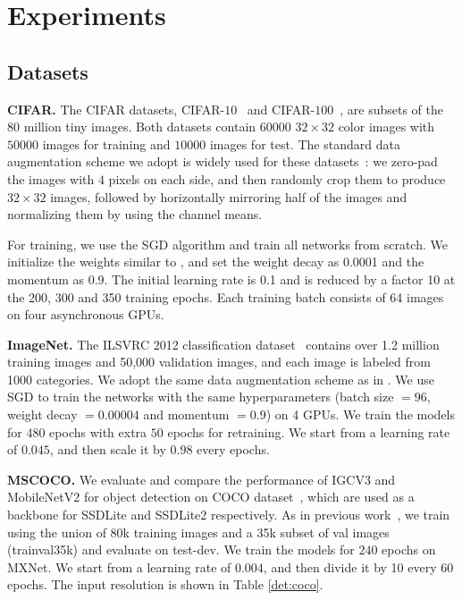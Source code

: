 \documentclass{bmvc2k}
\begin{document}
	\section{Experiments}
	\label{sec:exp}
	\subsection{Datasets}
	\noindent\textbf{CIFAR.}
	The CIFAR datasets, CIFAR-$10$~\cite{Cifar10} and CIFAR-$100$~\cite{Cifar100},
	are subsets of the $80$ million tiny images.
	Both datasets contain $60000$ $32\times32$ color images with $50000$ images for training and $10000$ images for test.
	The standard data augmentation scheme we adopt is widely used for these datasets~\cite{HeZRS16, LeeXGZT15, HuangLW16a, LarssonMS16a, LinCY13, RomeroBKCGB14, SpringenbergDBR14, SrivastavaGS15}: we zero-pad the images with $4$ pixels on each side, and then randomly crop them to produce $32\times32$ images, followed by horizontally mirroring half of the images and normalizing them by using the channel means.

	For training, we use the SGD algorithm and train all networks from scratch. We initialize the weights similar to \cite{HeZRS16, HeZRS16ECCV}, and set the weight decay as 0.0001 and the momentum as 0.9. The initial learning rate is 0.1 and is reduced by a factor 10 at the 200, 300 and 350 training epochs. Each training batch consists of 64 images on four asynchronous GPUs.

	\noindent\textbf{ImageNet.} The ILSVRC 2012 classification dataset~\cite{deng2009imagenet} contains over 1.2 million training images and 50,000 validation images, and each image is labeled from 1000 categories. We adopt the same data augmentation scheme as in \cite{HeZRS16,HeZRS16ECCV}. We use SGD to train the networks with the same hyperparameters (batch size $=96$, weight decay $=0.00004$ and momentum $=0.9$) on 4 GPUs. We train the models for $480$ epochs with extra $50$ epochs for retraining. We start from a learning rate of $0.045$, and then scale it by $0.98$ every epochs.

	\noindent\textbf{MSCOCO.} We evaluate and compare the performance of IGCV3 and MobileNetV2 for object detection on COCO dataset~\cite{lin2014microsoft}, which are used as a backbone for SSDLite and SSDLite2 respectively. As in previous work~\cite{sandler2018inverted}, we train using the union of 80k training images and a 35k subset of val images (trainval35k) and evaluate on test-dev.
	We train the models for $240$ epochs on MXNet. We start from a learning rate of $0.004$, and then divide it by 10 every 60 epochs. The input resolution is shown in Table \ref{det:coco}.
\end{document}
